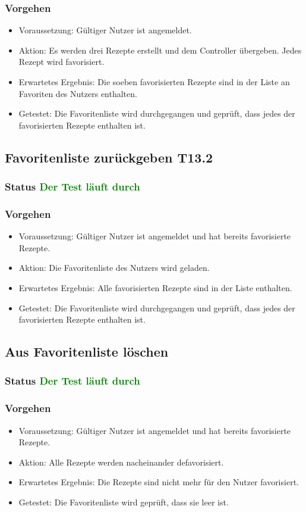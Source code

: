 \subsubsection{Vorgehen}
\begin{itemize}
	\item Voraussetzung: Gültiger Nutzer ist angemeldet.
	\item Aktion: Es werden drei Rezepte erstellt und dem Controller übergeben. Jedes Rezept wird favorisiert.
	\item Erwartetes Ergebnis: Die soeben favorisierten Rezepte sind in der Liste an Favoriten des Nutzers enthalten.
	\item Getestet: Die Favoritenliste wird durchgegangen und geprüft, dass jedes der favorisierten Rezepte enthalten ist.
\end{itemize}

\subsection{Favoritenliste zurückgeben T13.2}
\subsubsection{Status \textcolor{green}{ Der Test läuft durch} }
\subsubsection{Vorgehen}
\begin{itemize}
	\item Voraussetzung: Gültiger Nutzer ist angemeldet und hat bereits favorisierte Rezepte.
	\item Aktion: Die Favoritenliste des Nutzers wird geladen.
	\item Erwartetes Ergebnis: Alle favorisierten Rezepte sind in der Liste enthalten.
	\item Getestet: Die Favoritenliste wird durchgegangen und geprüft, dass jedes der favorisierten Rezepte enthalten ist.
\end{itemize}

\subsection{Aus Favoritenliste löschen}
\subsubsection{Status \textcolor{green}{ Der Test läuft durch} }
\subsubsection{Vorgehen}
\begin{itemize}
	\item Voraussetzung: Gültiger Nutzer ist angemeldet und hat bereits favorisierte Rezepte.
	\item Aktion: Alle Rezepte werden nacheinander defavorisiert.
	\item Erwartetes Ergebnis: Die Rezepte sind nicht mehr für den Nutzer favorisiert.
	\item Getestet: Die Favoritenliste wird geprüft, dass sie leer ist.
\end{itemize}
